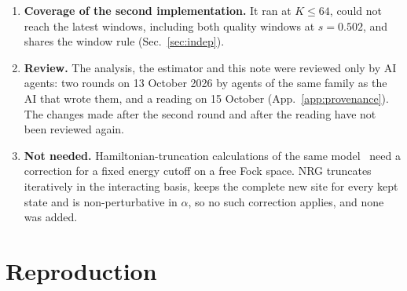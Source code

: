 \documentclass[10pt,a4paper]{article}
\begin{document}
\begin{enumerate}
  after the comparison with the $\varepsilon$ series.
\item \textbf{Coverage of the second implementation.} It ran at $K\le64$, could not reach the latest windows, including both quality
  windows at $s=0.502$, and shares the window rule (Sec.~\ref{sec:indep}).
\item \textbf{Review.} The analysis, the estimator and this note were reviewed only by AI agents: two rounds on 13 October 2026 by
  agents of the same family as the AI that wrote them, and a reading on 15 October (App.~\ref{app:provenance}). The changes made after
  the second round and after the reading have not been reviewed again.
\item \textbf{Not needed.} Hamiltonian-truncation calculations of the same model~\cite{Paper,HTnote} need a correction for a fixed energy cutoff on a free
  Fock space. NRG truncates iteratively in the interacting basis, keeps the complete new site for every kept state and is
  non-perturbative in $\alpha$, so no such correction applies, and none was added.
\end{enumerate}

\section{Reproduction}\label{sec:repro}
\end{document}
